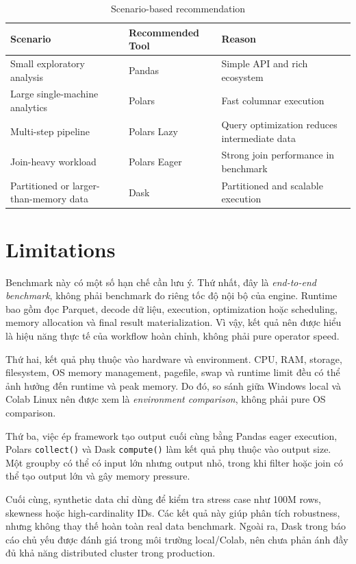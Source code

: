 \documentclass[12pt,a4paper]{article}
\begin{document}
\begin{table}[H]
\centering
\small
\renewcommand{\arraystretch}{1.15}
\caption{Scenario-based recommendation}
\begin{tabular}{|p{5cm}|p{4cm}|p{5cm}|}
\hline
\textbf{Scenario} & \textbf{Recommended Tool} & \textbf{Reason} \\
\hline
Small exploratory analysis & Pandas & Simple API and rich ecosystem \\
\hline
Large single-machine analytics & Polars & Fast columnar execution \\
\hline
Multi-step pipeline & Polars Lazy & Query optimization reduces intermediate data \\
\hline
Join-heavy workload & Polars Eager & Strong join performance in benchmark \\
\hline
Partitioned or larger-than-memory data & Dask & Partitioned and scalable execution \\
\hline
\end{tabular}
\end{table}

\section{Limitations}

Benchmark này có một số hạn chế cần lưu ý. Thứ nhất, đây là \textit{end-to-end benchmark}, không phải benchmark đo riêng tốc độ nội bộ của engine. Runtime bao gồm đọc Parquet, decode dữ liệu, execution, optimization hoặc scheduling, memory allocation và final result materialization. Vì vậy, kết quả nên được hiểu là hiệu năng thực tế của workflow hoàn chỉnh, không phải pure operator speed.

Thứ hai, kết quả phụ thuộc vào hardware và environment. CPU, RAM, storage, filesystem, OS memory management, pagefile, swap và runtime limit đều có thể ảnh hưởng đến runtime và peak memory. Do đó, so sánh giữa Windows local và Colab Linux nên được xem là \textit{environment comparison}, không phải pure OS comparison.

Thứ ba, việc ép framework tạo output cuối cùng bằng Pandas eager execution, Polars \texttt{collect()} và Dask \texttt{compute()} làm kết quả phụ thuộc vào output size. Một groupby có thể có input lớn nhưng output nhỏ, trong khi filter hoặc join có thể tạo output lớn và gây memory pressure.

Cuối cùng, synthetic data chỉ dùng để kiểm tra stress case như 100M rows, skewness hoặc high-cardinality IDs. Các kết quả này giúp phân tích robustness, nhưng không thay thế hoàn toàn real data benchmark. Ngoài ra, Dask trong báo cáo chủ yếu được đánh giá trong môi trường local/Colab, nên chưa phản ánh đầy đủ khả năng distributed cluster trong production.
\end{document}
